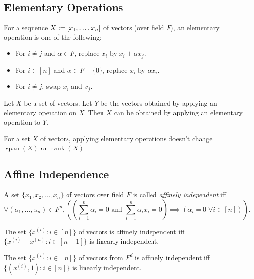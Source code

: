 \documentclass[a4paper,12pt,fleqn]{article}
\newenvironment*{tightemize}{\begin{itemize}[noitemsep]}{\end{itemize}}
\DeclareMathOperator{\Span}{span}
\DeclareMathOperator{\rank}{rank}
\begin{document}
\subsection{Elementary Operations}

\begin{definition}
For a sequence $X := [x_1, \ldots, x_n]$ of vectors (over field $F$),
an elementary operation is one of the following:
\begin{tightemize}
\item For $i \neq j$ and $\alpha \in F$, replace $x_i$ by $x_i + \alpha x_j$.
\item For $i \in [n]$ and $\alpha \in F - \{0\}$, replace $x_i$ by $\alpha x_i$.
\item For $i \neq j$, swap $x_i$ and $x_j$.
\end{tightemize}
\end{definition}

\begin{lemma}[Reversibililty]
Let $X$ be a set of vectors. Let $Y$ be the vectors obtained by applying
an elementary operation on $X$. Then $X$ can be obtained
by applying an elementary operation to $Y$.
\end{lemma}

\begin{lemma}
For a set $X$ of vectors, applying elementary operations doesn't change
$\Span(X)$ or $\rank(X)$.
\end{lemma}

\subsection{Affine Independence}

\begin{definition}
A set $\{x_1, x_2, \ldots, x_n\}$ of vectors over field $F$
is called \emph{affinely independent} iff
\[ \forall (\alpha_1, \ldots, \alpha_n) \in F^n,
\left( \left(\sum_{i=1}^n \alpha_i = 0 \textrm{ and } \sum_{i=1}^n \alpha_i x_i = 0 \right)
    \implies (\alpha_i = 0 \;\forall i \in [n])\right). \]
\end{definition}

\begin{theorem}
The set $\{x^{(i)}: i \in [n]\}$ of vectors is affinely independent iff
$\{x^{(i)} - x^{(n)}: i \in [n-1]\}$ is linearly independent.
\end{theorem}

\begin{theorem}
The set $\{x^{(i)}: i \in [n]\}$ of vectors from $F^d$ is affinely independent iff
$\{(x^{(i)}, 1): i \in [n]\}$ is linearly independent.
\end{theorem}
\end{document}
